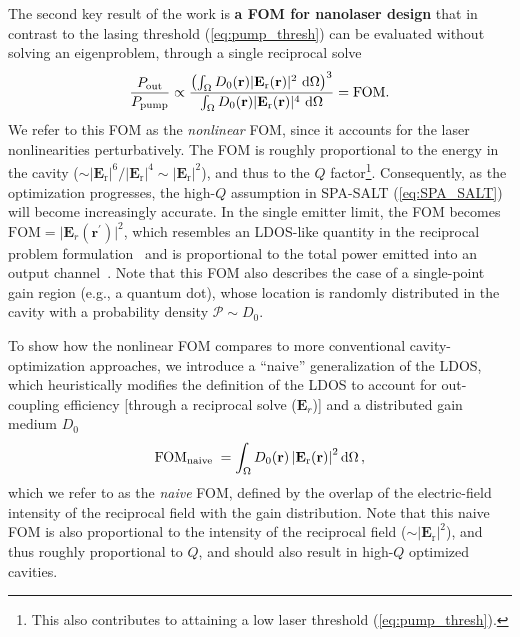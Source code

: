 The second key result of the work is \textbf{a FOM for nanolaser design} that in contrast to the lasing threshold (\eqref{eq:pump_thresh}) can be evaluated without solving an eigenproblem, through a single reciprocal solve~\cite{ownpub4}
\begin{equation}\label{eq:eff_nl}
    \frac{P_\text{out}}{P_\text{pump}} \propto \frac{\left( \int_{\Omega} D_0(\mathbf{r})|\mathbf{E}_{\text{r}}(\mathbf{r})|^2 \,  \mathop{}\!\text{d} \Omega \right)^3} {\int_{\Omega} D_0(\mathbf{r}) |\mathbf{E}_{\text{r}}(\mathbf{r})|^4 \,  \mathop{}\!\text{d} \Omega} = \text{FOM}.
\end{equation}
We refer to this FOM as the \emph{nonlinear} FOM, since it accounts for the laser nonlinearities perturbatively. The FOM is roughly proportional 
to the energy in the cavity ($\sim |\mathbf{E}_{\text{r}}|^6 / |\mathbf{E}_{\text{r}}|^4 \sim |\mathbf{E}_{\text{r}}|^2$), and thus to the $Q$ factor\footnote{This also contributes to attaining a low
laser threshold (\eqref{eq:pump_thresh}).}. Consequently, as the optimization progresses, the high-$Q$ assumption in SPA-SALT (\eqref{eq:SPA_SALT}) will become increasingly accurate. In the single emitter limit, the FOM becomes
$\text{FOM}=\vert \mathbf{E}_{r}(\mathbf{r}^\prime) \vert^2$, which resembles an LDOS-like quantity in the reciprocal problem formulation~\cite{reci} and is proportional to the total power emitted into an output channel~\cite[App.~C]{reci}. 
 Note that this FOM also describes the case of a single-point gain region (e.g., a quantum dot),
whose location is randomly distributed in the cavity with a probability density $\mathcal{P} \sim D_0$. 

To show how the nonlinear FOM compares to more conventional cavity-optimization approaches, we introduce a “naive” generalization of the LDOS, which heuristically modifies the definition
of the LDOS to account for out-coupling efficiency [through a reciprocal solve ($\mathbf{E}_r$)] and a distributed gain
medium $D_0$
\begin{equation}\label{eq:SEL}
 \text{FOM}_{\text {naive }}=\int_{\Omega} D_0(\mathbf{r})\left|\mathbf{E}_{\text{r}}(\mathbf{r})\right|^2 \mathop{}\!\text{d} \Omega\,,
\end{equation}
which we refer to as the \emph{naive} FOM, defined by the overlap of the electric-field intensity of the reciprocal field with the gain distribution.
Note that this naive FOM is also proportional to the intensity of the reciprocal field ($\sim |\mathbf{E}_{\text{r}}|^2$), and thus roughly proportional to $Q$, and should also result in 
high-$Q$ optimized cavities.

